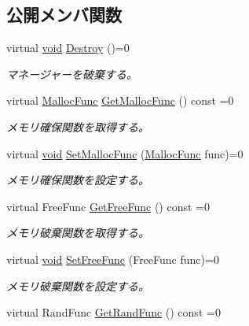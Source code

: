 \subsection*{公開メンバ関数}
\begin{DoxyCompactItemize}
\item 
virtual \mbox{\hyperlink{namespace_effekseer_ab34c4088e512200cf4c2716f168deb56}{void}} \mbox{\hyperlink{class_effekseer_1_1_manager_a59eeea8d94285186a5d04dfad0b682ff}{Destroy}} ()=0
\begin{DoxyCompactList}\small\item\em マネージャーを破棄する。 \end{DoxyCompactList}\item 
virtual \mbox{\hyperlink{namespace_effekseer_a2f9a04a7b2d08a8f2173ce47e57ff742}{Malloc\+Func}} \mbox{\hyperlink{class_effekseer_1_1_manager_aacbf3bb08982ff3b7fd3c5685b88c286}{Get\+Malloc\+Func}} () const =0
\begin{DoxyCompactList}\small\item\em メモリ確保関数を取得する。 \end{DoxyCompactList}\item 
virtual \mbox{\hyperlink{namespace_effekseer_ab34c4088e512200cf4c2716f168deb56}{void}} \mbox{\hyperlink{class_effekseer_1_1_manager_af1b85d9b77c7e923a399c3cc84a34fbc}{Set\+Malloc\+Func}} (\mbox{\hyperlink{namespace_effekseer_a2f9a04a7b2d08a8f2173ce47e57ff742}{Malloc\+Func}} func)=0
\begin{DoxyCompactList}\small\item\em メモリ確保関数を設定する。 \end{DoxyCompactList}\item 
virtual Free\+Func \mbox{\hyperlink{class_effekseer_1_1_manager_a83bfa1c67a8d52a09a6fa5481e11697c}{Get\+Free\+Func}} () const =0
\begin{DoxyCompactList}\small\item\em メモリ破棄関数を取得する。 \end{DoxyCompactList}\item 
virtual \mbox{\hyperlink{namespace_effekseer_ab34c4088e512200cf4c2716f168deb56}{void}} \mbox{\hyperlink{class_effekseer_1_1_manager_a81402561ce17b0d4c681811affbd7340}{Set\+Free\+Func}} (Free\+Func func)=0
\begin{DoxyCompactList}\small\item\em メモリ破棄関数を設定する。 \end{DoxyCompactList}\item 
virtual Rand\+Func \mbox{\hyperlink{class_effekseer_1_1_manager_a1694b05f00253f9468d4692e4e5f462b}{Get\+Rand\+Func}} () const =0

\end{DoxyCompactItemize}
